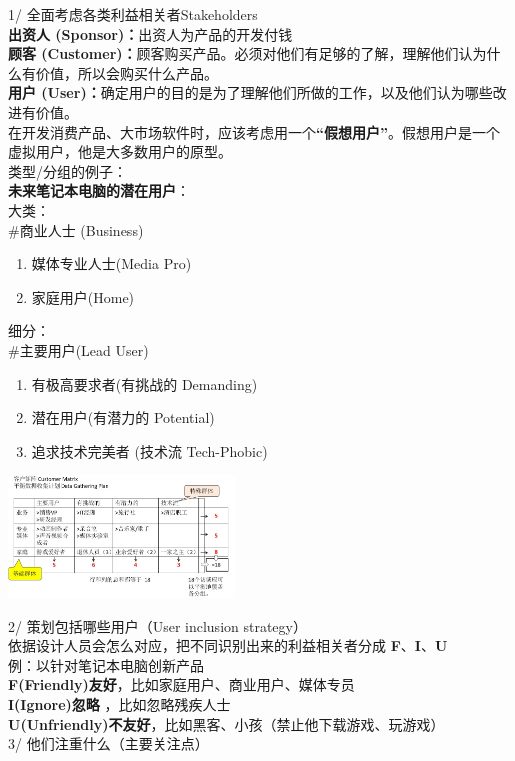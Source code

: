 1/ 全面考虑各类利益相关者Stakeholders\\
\textbf{出资人 (Sponsor)：}出资人为产品的开发付钱\\
\textbf{顾客
(Customer)：}顾客购买产品。必须对他们有足够的了解，理解他们认为什么有价值，所以会购买什么产品。\\
\textbf{用户
(User)：}确定用户的目的是为了理解他们所做的工作，以及他们认为哪些改进有价值。\\
在开发消费产品、大市场软件时，应该考虑用一个\textbf{``假想用户''}。假想用户是一个虚拟用户，他是大多数用户的原型。\\
类型/分组的例子：\\
\textbf{未来笔记本电脑的潜在用户}：\\
大类：\\
\#商业人士 (Business)

\begin{enumerate}
\tightlist
\item
  媒体专业人士(Media Pro)
\item
  家庭用户(Home)
\end{enumerate}

细分：\\
\#主要用户(Lead User)

\begin{enumerate}
\tightlist
\item
  有极高要求者(有挑战的 Demanding)
\item
  潜在用户(有潜力的 Potential)
\item
  追求技术完美者 (技术流 Tech-Phobic)
\end{enumerate}


\includegraphics[width=6cm]{CustomerMatrixScreenshot_2022-12-16_180326.jpg}

2/ 策划包括哪些用户（User inclusion strategy）\\
依据设计人员会怎么对应，把不同识别出来的利益相关者分成
\textbf{F}、\textbf{I}、\textbf{U}\\
例：以针对笔记本电脑创新产品\\
\textbf{F(Friendly)友好}，比如家庭用户、商业用户、媒体专员\\
\textbf{I(Ignore)忽略} ，比如忽略残疾人士\\
\textbf{U(Unfriendly)不友好}，比如黑客、小孩（禁止他下载游戏、玩游戏）\\
3/ 他们注重什么（主要关注点）


